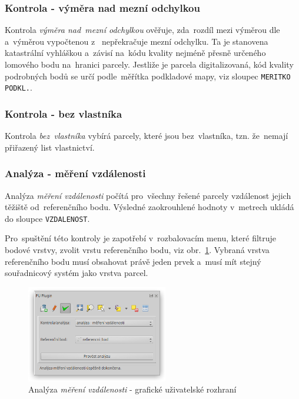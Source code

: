 \subsubsection{Kontrola - výměra nad mezní odchylkou}
\label{manual_kontrola_vymera}

Kontrola \textit{výměra nad~mezní odchylkou} ověřuje, zda~rozdíl mezi výměrou dle~ a~výměrou vypočtenou z~ nepřekračuje mezní odchylku. Ta je stanovena katastrální vyhláškou a~závisí na~kódu kvality nejméně přesně určeného lomového bodu na~hranici parcely. Jestliže je parcela digitalizovaná, kód kvality podrobných bodů se určí podle~měřítka podkladové mapy, viz sloupec \texttt{MERITKO PODKL.}.

\subsubsection{Kontrola - bez vlastníka}
\label{manual_kontrola_bez_vlastnika}

Kontrola \textit{bez~vlastníka} vybírá parcely, které jsou bez~vlastníka, tzn. že~nemají přiřazený list vlastnictví.

\subsubsection{Analýza - měření vzdálenosti}
\label{manual_analyza_vzdalenosti}

Analýza \textit{měření vzdálenosti} počítá pro~všechny řešené parcely vzdálenost jejich těžiště od~referenčního bodu. Výsledné zaokrouhlené hodnoty v~metrech ukládá do sloupce \texttt{VZDALENOST}.

Pro~spuštění této kontroly je zapotřebí v~rozbalovacím menu, které filtruje bodové vrstvy, zvolit vrstu referenčního bodu, viz obr.~\ref{fig:manual_analyza_vzdalenosti_gui}. Vybraná vrstva referenčního bodu musí obsahovat právě jeden prvek a~musí mít stejný souřadnicový systém jako vrstva parcel.

	\begin{figure}[H]
		\centering
		\includegraphics[width=0.55\textwidth]{./pictures/analyza_vzdalenost.png}
		\caption[Analýza \textit{měření vzdálenosti} - grafické uživatelské rozhraní]{Analýza \textit{měření vzdálenosti} - grafické uživatelské rozhraní}
		\label{fig:manual_analyza_vzdalenosti_gui}
 	\end{figure}

